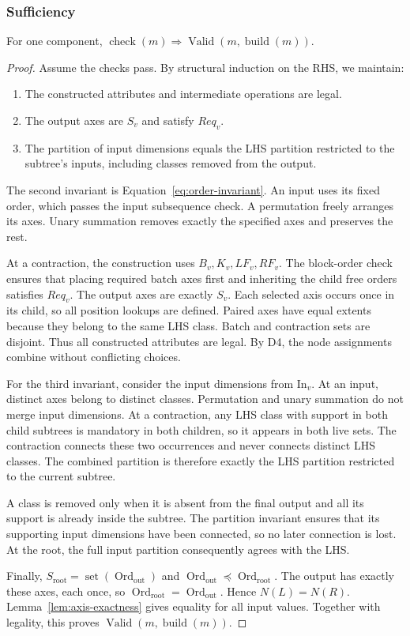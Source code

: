 \subsubsection{Sufficiency}
\begin{lemma}[Sufficiency]
\label{lem:sufficiency}
For one component,
$\operatorname{check}(m)\Rightarrow
\operatorname{Valid}(m,\operatorname{build}(m))$.
\end{lemma}
\begin{proof}
Assume the checks pass. By structural induction on the RHS, we maintain:
\begin{enumerate}
\item The constructed attributes and intermediate operations are legal.
\item The output axes are $S_v$ and satisfy $Req_v$.
\item The partition of input dimensions equals the LHS partition restricted to
the subtree's inputs, including classes removed from the output.
\end{enumerate}
The second invariant is Equation~\eqref{eq:order-invariant}.
An input uses its fixed order, which passes the input subsequence check.
A permutation freely arranges its axes. Unary summation removes exactly
the specified axes and preserves the rest.

At a contraction, the construction uses $B_v,K_v,LF_v,RF_v$.
The block-order check ensures that placing required batch axes first and
inheriting the child free orders satisfies $Req_v$. The output axes are
exactly $S_v$. Each selected axis occurs once in its child, so all position
lookups are defined. Paired axes have equal extents because they belong to
the same LHS class. Batch and contraction sets are disjoint. Thus all
constructed attributes are legal.
By D4, the node assignments combine without conflicting choices.

For the third invariant, consider the input dimensions from $\mathrm{In}_v$.
At an input, distinct axes belong to distinct classes. Permutation and
unary summation do not merge input dimensions. At a contraction, any LHS class with
support in both child subtrees is mandatory in both children, so it appears
in both live sets. The contraction connects these two occurrences and never
connects distinct LHS classes. The combined partition is therefore exactly
the LHS partition restricted to the current subtree.

A class is removed only when it is absent from the final output and all its
support is already inside the subtree. The partition invariant ensures that
its supporting input dimensions have been connected, so no later connection is lost.
At the root, the full input partition consequently agrees with the LHS.

Finally, $S_{\mathrm{root}}=\operatorname{set}(\operatorname{Ord}_{\mathrm{out}})$ and
$\operatorname{Ord}_{\mathrm{out}}\preceq\operatorname{Ord}_{\mathrm{root}}$. The output has exactly these
axes, each once, so $\operatorname{Ord}_{\mathrm{root}}=\operatorname{Ord}_{\mathrm{out}}$. Hence
$N(L)=N(R)$. Lemma~\ref{lem:axis-exactness} gives equality for all input
values. Together with legality, this proves
$\operatorname{Valid}(m,\operatorname{build}(m))$.
\end{proof}

